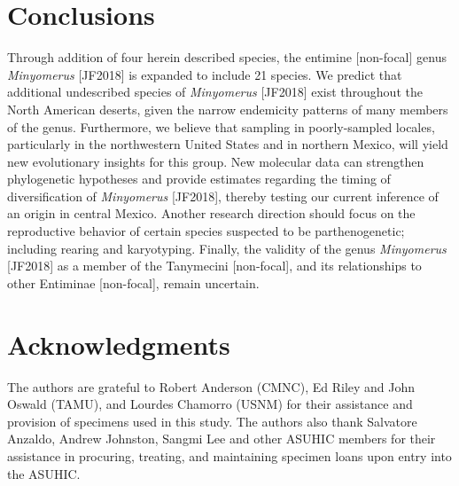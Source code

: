 \documentclass[fleqn,10pt,lineno]{wlpeerj} %
\begin{document}
\section*{Conclusions}
	Through addition of four herein described species, the entimine [non-focal] genus \textit{Minyomerus} [JF2018] is expanded to include 21 species.
	We predict that additional undescribed species of \textit{Minyomerus} [JF2018] exist throughout the North American deserts, given the narrow endemicity patterns of many members of the genus.
	Furthermore, we believe that sampling in poorly-sampled locales, particularly in the northwestern United States and in northern Mexico, will yield new evolutionary insights for this group.
	New molecular data can strengthen phylogenetic hypotheses and provide estimates regarding the timing of diversification of \textit{Minyomerus} [JF2018], thereby testing our current inference of an origin in central Mexico.
	Another research direction should focus on the reproductive behavior of certain species suspected to be parthenogenetic; including rearing and karyotyping.
	Finally, the validity of the genus \textit{Minyomerus} [JF2018] as a member of the Tanymecini [non-focal], and its relationships to other Entiminae [non-focal], remain uncertain.
		
\section*{Acknowledgments}
	The authors are grateful to Robert Anderson (CMNC), Ed Riley and John Oswald (TAMU), and Lourdes Chamorro (USNM) for their assistance and provision of specimens used in this study.
	The authors also thank Salvatore Anzaldo, Andrew Johnston, Sangmi Lee and other ASUHIC members for their assistance in procuring, treating, and maintaining specimen loans upon entry into the ASUHIC.
\end{document}
